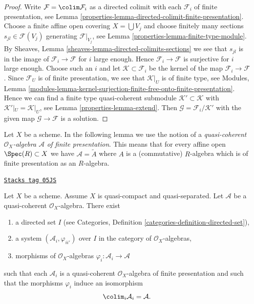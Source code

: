 \begin{proof}

Write $\mathcal{F} = \colim \mathcal{F}_i$ as a directed colimit
with each $\mathcal{F}_i$ of finite presentation,
see Lemma \ref{properties-lemma-directed-colimit-finite-presentation}.
Choose a finite affine open covering $X = \bigcup V_j$ and choose
finitely many sections $s_{jl} \in \mathcal{F}(V_j)$ generating
$\mathcal{F}|_{V_j}$, see Lemma \ref{properties-lemma-finite-type-module}.
By Sheaves, Lemma \ref{sheaves-lemma-directed-colimits-sections}
we see that $s_{jl}$ is in the image of $\mathcal{F}_i \to \mathcal{F}$
for $i$ large enough. Hence $\mathcal{F}_i \to \mathcal{F}$ is surjective
for $i$ large enough. Choose such an $i$ and let
$\mathcal{K} \subset \mathcal{F}_i$ be the kernel of the map
$\mathcal{F}_i \to \mathcal{F}$. Since $\mathcal{F}_U$ is of finite
presentation, we see that $\mathcal{K}|_U$ is of finite type, see
Modules, Lemma
\ref{modules-lemma-kernel-surjection-finite-free-onto-finite-presentation}.
Hence we can find a finite type quasi-coherent submodule
$\mathcal{K}' \subset \mathcal{K}$ with $\mathcal{K}'|_U = \mathcal{K}|_U$,
see Lemma \ref{properties-lemma-extend}. Then
$\mathcal{G} = \mathcal{F}_i/\mathcal{K}'$
with the given map $\mathcal{G} \to \mathcal{F}$ is a solution.
\end{proof}

Let $X$ be a scheme. In the following lemma we use the notion
of a {\it quasi-coherent $\mathcal{O}_X$-algebra $\mathcal{A}$
of finite presentation}. This means that for every affine open
$\Spec(R) \subset X$ we have $\mathcal{A} = \widetilde{A}$
where $A$ is a (commutative) $R$-algebra which is of finite presentation
as an $R$-algebra.

\begin{lemma}
\label{properties-lemma-algebra-directed-colimit-finite-presentation}
\href{https://stacks.math.columbia.edu/tag/05JS}{\texttt{Stacks tag 05JS}}

Let $X$ be a scheme. Assume $X$ is quasi-compact and quasi-separated.
Let $\mathcal{A}$ be a quasi-coherent $\mathcal{O}_X$-algebra.
There exist
\begin{enumerate}
\item a directed set $I$ (see
Categories, Definition \ref{categories-definition-directed-set}),
\item a system $(\mathcal{A}_i, \varphi_{ii'})$
over $I$ in the category of $\mathcal{O}_X$-algebras,
\item morphisms of $\mathcal{O}_X$-algebras
$\varphi_i : \mathcal{A}_i \to \mathcal{A}$
\end{enumerate}
such that each $\mathcal{A}_i$ is a quasi-coherent $\mathcal{O}_X$-algebra
of finite presentation and such that the morphisms $\varphi_i$
induce an isomorphism
$$
\colim_i \mathcal{A}_i
=
\mathcal{A}.
$$
\end{lemma}

